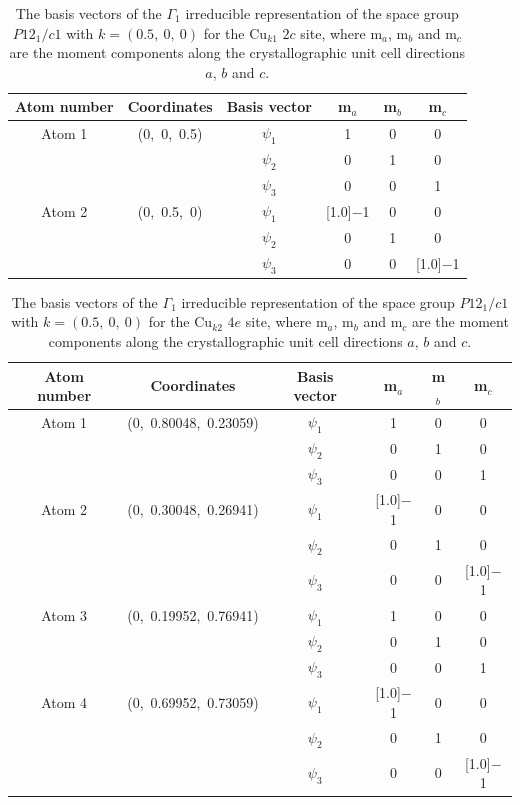 \documentclass[
sn-mathphys,
Numbered,
onecolumn]
{sn-jnl}%
\newcommand{\minus}{\scalebox{0.75}[1.0]{$-$}}
\begin{document}
\begin{table}[ht!]
    \centering
    \begin{tabular}{c c c c c c} \hline \hline
      Atom number & Coordinates & {Basis vector} & {m$_a$} & m$_b$ &{m$_c$} \\ \hline
       Atom 1 & (0,~0,~0.5) & $\psi_1$ & 1 & 0 & 0 \\ 
      & & $\psi_2$ & 0 & 1 &  0  \\
     & & $\psi_3$ & 0 & 0 & 1  \\
     Atom 2 & (0,~0.5,~0) & $\psi_1$ &  \minus 1 & 0 & 0 \\
    & & $\psi_2$ & 0 &  1 &  0  \\
     & & $\psi_3$ & 0 & 0 &  \minus 1  \\ 
       \hline \hline
   
\end{tabular}
    \caption{The basis vectors of the $\Gamma_1$ irreducible representation of the space group $P12_1/c1$ with ${k}=(0.5,~0,~0)$ for the Cu$_{k1}$ $2c$ site, where m$_a$, m$_b$ and m$_c$ are the moment components along the crystallographic unit cell directions $a$, $b$ and $c$.}
    \label{avv_cuk1_BVs_gamma1}
\end{table}

\begin{table}[ht!]
    \centering
    \begin{tabular}{c c c c c c} \hline \hline
      Atom number & Coordinates & {Basis vector} & {m$_a$} & m$_b$ &{m$_c$} \\ \hline
       Atom 1 & (0,~0.80048,~0.23059) & $\psi_1$ & 1 & 0 & 0 \\ 
      & & $\psi_2$ & 0 & 1 &  0  \\
     & & $\psi_3$ & 0 & 0 & 1  \\
     Atom 2 & (0,~0.30048,~0.26941) & $\psi_1$ & \minus 1 & 0 & 0 \\
    & & $\psi_2$ & 0 &  1 &  0  \\
     & & $\psi_3$ & 0 & 0 & \minus 1  \\ 
     Atom 3 & (0,~0.19952,~0.76941) & $\psi_1$ &  1 & 0 & 0 \\
    & & $\psi_2$ & 0 &  1 &  0  \\
     & & $\psi_3$ & 0 & 0 &  1  \\ 
     Atom 4 & (0,~0.69952,~0.73059) & $\psi_1$ & \minus 1 & 0 & 0 \\
    & & $\psi_2$ & 0 &  1 &  0  \\
     & & $\psi_3$ & 0 & 0 & \minus 1 \\ 
       \hline \hline
   
\end{tabular}
    \caption{The basis vectors of the $\Gamma_1$ irreducible representation of the space group $P12_1/c1$ with ${k}=(0.5,~0,~0)$ for the Cu$_{k2}$ $4e$ site, where m$_a$, m$_b$ and m$_c$ are the moment components along the crystallographic unit cell directions $a$, $b$ and $c$.}
    \label{avv_cuk2_BVs_gamma1}
\end{table}
\end{document}
